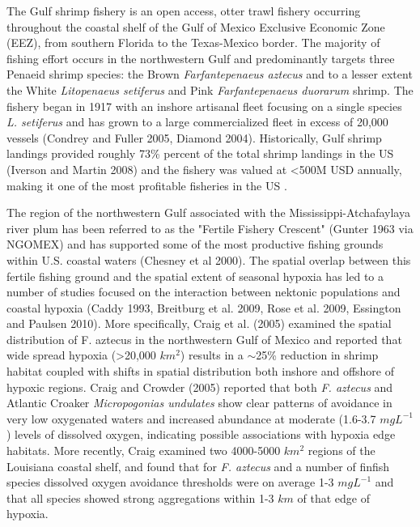 \documentclass[10pt]{article}
\begin{document}
The Gulf shrimp fishery is an open access, otter trawl fishery occurring throughout the coastal shelf of the Gulf of Mexico Exclusive Economic Zone (EEZ), from southern Florida to the Texas-Mexico border.  The majority of fishing effort occurs in the northwestern Gulf and predominantly targets three Penaeid shrimp species: the Brown \textit{Farfantepenaeus aztecus} and to a lesser extent the White \textit{Litopenaeus setiferus} and Pink \textit{Farfantepenaeus duorarum} shrimp.  The fishery began in 1917 with an inshore artisanal fleet focusing on a single species \textit{L. setiferus} and has grown to a large commercialized fleet in excess of 20,000 vessels (Condrey and Fuller 2005, Diamond 2004).  Historically, Gulf shrimp landings provided roughly 73\% percent of the total shrimp landings in the US (Iverson and Martin 2008) and the fishery was valued at \textless 500M USD annually, making it one of the most profitable fisheries in the US \cite{nance_effort_1993, diamond_bycatch_2004}. 

The region of the northwestern Gulf associated with the Mississippi-Atchafaylaya river plum has been referred to as the "Fertile Fishery Crescent" (Gunter 1963 via NGOMEX) and has supported some of the most productive fishing grounds within U.S. coastal waters (Chesney et al 2000).  The spatial overlap between this fertile fishing ground and the spatial extent of seasonal hypoxia has led to a number of studies focused on the interaction between nektonic populations and coastal hypoxia (Caddy 1993, Breitburg et al. 2009, Rose et al. 2009, Essington and Paulsen 2010).  More specifically, Craig et al. (2005) examined the spatial distribution of F. aztecus in the northwestern Gulf of Mexico and reported that wide spread hypoxia (\textgreater 20,000 $ km^{2}$) results in a $\sim$25\% reduction in shrimp habitat coupled with shifts in spatial distribution both inshore and offshore of hypoxic regions.  Craig and Crowder (2005) reported that both \textit{F. aztecus} and Atlantic Croaker \textit{Micropogonias undulates} show clear patterns of avoidance in very low oxygenated waters and increased abundance at moderate (1.6-3.7 $ mg{} L^{-1} $) levels of dissolved oxygen, indicating possible associations with hypoxia edge habitats.  More recently, Craig \cite{craig_aggregation_2012} examined two 4000-5000 $ km^{2} $ regions of the Louisiana coastal shelf, and found that for \textit{F. aztecus} and a number of finfish species dissolved oxygen avoidance thresholds were on average 1-3 $ mg{} L^{-1} $ and that all species showed strong aggregations within 1-3 $ km $ of that edge of hypoxia.  
\end{document}
